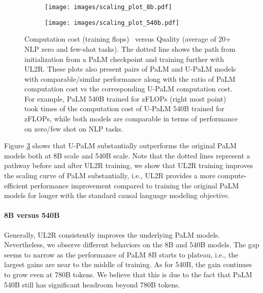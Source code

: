 \documentclass{article}
\newcommand{\methodname}{UL2R\xspace}
\newcommand{\modelname}{U-PaLM\xspace}
\begin{document}
\begin{figure}
     \centering
     \begin{subfigure}[b]{0.45\textwidth}
         \centering
         \texttt{[image: images/scaling\_plot\_8b.pdf]}
        \label{fig:8b_scaling}
     \end{subfigure}
     \hspace{5pt}
     \begin{subfigure}[b]{0.45\textwidth}
         \centering
         \texttt{[image: images/scaling\_plot\_540b.pdf]}
        \label{fig:540b_scaling}
     \end{subfigure}
    \caption{Computation cost (training flops)~\citep{dehghani2021efficiency} versus Quality (average of 20+ NLP zero and few-shot tasks). The dotted line shows the path from initialization from a PaLM checkpoint and training further with \methodname. These plots also present pairs of PaLM and \modelname models with comparable/similar performance along with the ratio of PaLM computation cost vs the corresponding \modelname computation cost.  For example, PaLM 540B trained for  zFLOPs (right most point) took  times of the computation cost of \modelname 540B trained for  zFLOPs, while both models are comparable in terms of performance on zero/few shot on NLP tasks.}
    \label{fig:scaling}
\end{figure}



Figure \ref{fig:scaling} shows that \modelname substantially outperforms the original PaLM models both at 8B scale and 540B scale. Note that the dotted lines represent a pathway before and after \methodname training, we show that \methodname training improves the scaling curve of PaLM substantially, i.e., \methodname provides a more compute-efficient performance improvement compared to training the original PaLM models for longer with the standard causal language modeling objective.

\paragraph{8B versus 540B} Generally, \methodname consistently improves the underlying PaLM models. Nevertheless, we observe different behaviors on the 8B and 540B models. The gap seems to narrow as the performance of PaLM 8B starts to plateau, i.e., the largest gains are near to the middle of training. As for 540B, the gain continues to grow even at 780B tokens. We believe that this is due to the fact that PaLM 540B still has significant headroom beyond 780B tokens.
\end{document}
